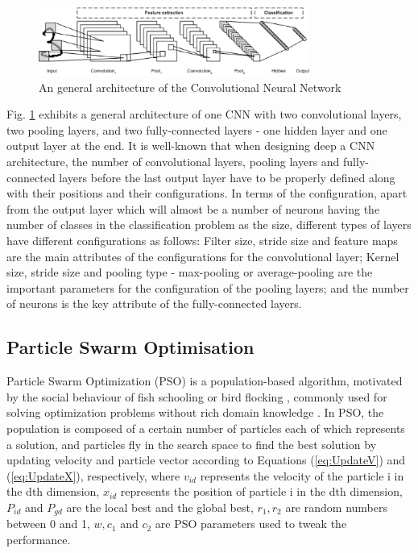 \documentclass[conference]{IEEEtran}
\begin{document}
\begin{figure}[!t]
	\centering
	\includegraphics[width=3.5in]{cnn_architecture}
	\caption{An general architecture of the Convolutional Neural Network \cite{CNNFig:Tim}}
	\label{fig:CNNArchitecture}
\end{figure}

Fig. \ref{fig:CNNArchitecture} exhibits a general architecture of one CNN with two convolutional layers, two pooling layers, and two fully-connected layers - one hidden layer and one output layer at the end. It is well-known that when designing deep a CNN architecture, the number of convolutional layers, pooling layers and fully-connected layers before the last output layer have to be properly defined along with their positions and their configurations. In terms of the configuration, apart from the output layer which will almost be a number of neurons having the number of classes in the classification problem as the size, different types of layers have different configurations as follows: Filter size, stride size and feature maps are the main attributes of the configurations for the convolutional layer; Kernel size, stride size and pooling type - max-pooling or average-pooling are the important parameters for the configuration of the pooling layers; and the number of neurons is the key attribute of the fully-connected layers. %

\subsection{Particle Swarm Optimisation}

Particle Swarm Optimization (PSO) is a population-based algorithm, motivated by the social behaviour of fish schooling or bird flocking \cite{PSOIntro:Kennedy} \cite{PSOIntro:Eberhart}, commonly used for solving optimization problems without rich domain knowledge \cite{PSOIntro:Yanan}. In PSO, the population is composed of a certain number of particles each of which represents a solution, and particles fly in the search space to find the best solution by updating velocity and particle vector according to Equations (\ref{eq:UpdateV}) and (\ref{eq:UpdateX}), respectively, where $v_{id}$ represents the velocity of the particle i in the dth dimension, $x_{id}$ represents the position of particle i in the dth dimension, $P_{id}$ and $P_{gd}$ are the local best and the global best, $r_{1}, r_{2}$ are random numbers between 0 and 1, $w, c_{1}$ and $c_{2}$ are PSO parameters used to tweak the performance. 
\end{document}
